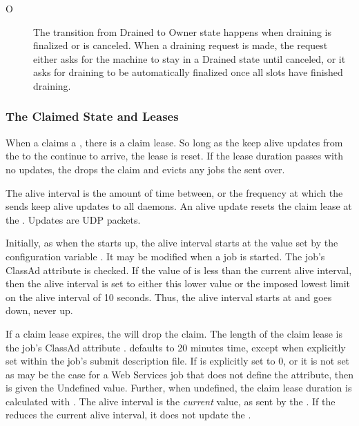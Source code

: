 \begin{itemize}
\begin{description}

\item[O] The transition from Drained to Owner state happens when
  draining is finalized or is canceled.  When a draining request is
  made, the request either asks for the machine to stay in a Drained
  state until canceled, or it asks for draining to be automatically
  finalized once all slots have finished draining.

\end{description}

\end{itemize}

\subsubsection{\label{sec:ClaimedState} The Claimed State and Leases}

When a  claims a , there is a claim lease.
So long as the keep alive updates from the  to the
 continue to arrive, the lease is reset.
If the lease duration passes with no updates,
the  drops the claim and evicts any jobs the
 sent over.

The alive interval is the amount of time between,
or the frequency at which the  sends keep alive updates 
to all  daemons.
An alive update resets the claim lease at the .
Updates are UDP packets.

Initially, as when the  starts up,
the alive interval starts at the value set by the 
configuration variable .  
It may be modified when a job is started.
The job's ClassAd attribute  is checked.
If the value of  is less than the current
alive interval,
then the alive interval is set to either this lower value
or the imposed lowest limit on the alive interval of 10 seconds.
Thus, the alive interval starts at  and goes down,
never up.

If a claim lease expires,
the  will drop the claim.
The length of the claim lease is 
the job's ClassAd attribute .
 defaults to 20 minutes time,
except when explicitly
set within the job's submit description file.
If  is explicitly set to 0, 
or it is not set as may be the case for a Web Services job
that does not define the attribute, 
then  is given the Undefined value.
Further, when undefined,
the claim lease duration is calculated with
.
The alive interval is the \emph{current} value,
as sent by the .
If the  reduces the current alive interval,
it does not update the .

